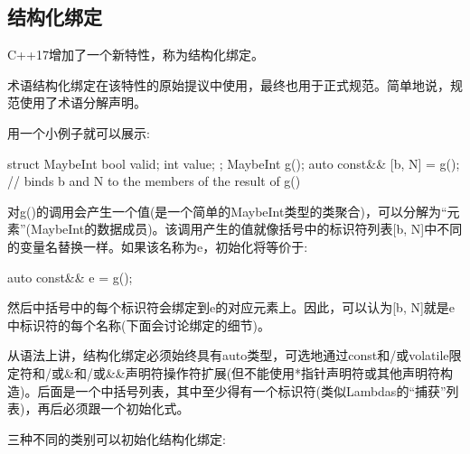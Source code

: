 \subsection{结构化绑定}

C++17增加了一个新特性，称为结构化绑定。

\begin{notice}
术语结构化绑定在该特性的原始提议中使用，最终也用于正式规范。简单地说，规范使用了术语分解声明。
\end{notice}

用一个小例子就可以展示:

\begin{cpp}
struct MaybeInt { bool valid; int value; };
MaybeInt g();
auto const&& [b, N] = g(); // binds b and N to the members of the result of g()
\end{cpp}

对g()的调用会产生一个值(是一个简单的MaybeInt类型的类聚合)，可以分解为“元素”(MaybeInt的数据成员)。该调用产生的值就像括号中的标识符列表[b, N]中不同的变量名替换一样。如果该名称为e，初始化将等价于:

\begin{cpp}
auto const&& e = g();
\end{cpp}

然后中括号中的每个标识符会绑定到e的对应元素上。因此，可以认为[b, N]就是e中标识符的每个名称(下面会讨论绑定的细节)。

从语法上讲，结构化绑定必须始终具有auto类型，可选地通过const和/或volatile限定符和/或\&和/或\&\&声明符操作符扩展(但不能使用*指针声明符或其他声明符构造)。后面是一个中括号列表，其中至少得有一个标识符(类似Lambdas的“捕获”列表)，再后必须跟一个初始化式。

三种不同的类别可以初始化结构化绑定:

